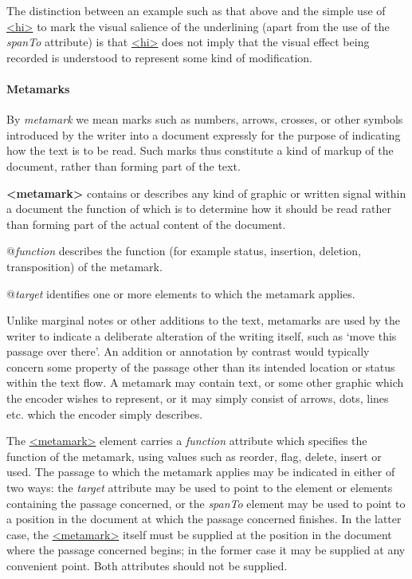 The distinction between an example such as that above and the simple use of \hyperref[TEI.hi]{<hi>} to mark the visual salience of the underlining (apart from the use of the {\itshape spanTo} attribute) is that \hyperref[TEI.hi]{<hi>} does not imply that the visual effect being recorded is understood to represent some kind of modification.
\paragraph[{Metamarks}]{Metamarks}\label{PH-meta}\par
By \textit{metamark} we mean marks such as numbers, arrows, crosses, or other symbols introduced by the writer into a document expressly for the purpose of indicating how the text is to be read. Such marks thus constitute a kind of markup of the document, rather than forming part of the text. 
\begin{sansreflist}
  
\item [\textbf{<metamark>}] contains or describes any kind of graphic or written signal within a document the function of which is to determine how it should be read rather than forming part of the actual content of the document.\hfil\\[-10pt]\begin{sansreflist}
    \item[@{\itshape function}]
  describes the function (for example status, insertion, deletion, transposition) of the metamark.
    \item[@{\itshape target}]
  identifies one or more elements to which the metamark applies.
\end{sansreflist}  
\end{sansreflist}
\par
Unlike marginal notes or other additions to the text, metamarks are used by the writer to indicate a deliberate alteration of the writing itself, such as ‘move this passage over there’. An addition or annotation by contrast would typically concern some property of the passage other than its intended location or status within the text flow. A metamark may contain text, or some other graphic which the encoder wishes to represent, or it may simply consist of arrows, dots, lines etc. which the encoder simply describes.\par
The \hyperref[TEI.metamark]{<metamark>} element carries a {\itshape function} attribute which specifies the function of the metamark, using values such as reorder, flag, delete, insert or used. The passage to which the metamark applies may be indicated in either of two ways: the {\itshape target} attribute may be used to point to the element or elements containing the passage concerned, or the {\itshape spanTo} element may be used to point to a position in the document at which the passage concerned finishes. In the latter case, the \hyperref[TEI.metamark]{<metamark>} itself must be supplied at the position in the document where the passage concerned begins; in the former case it may be supplied at any convenient point. Both attributes should not be supplied.\par
